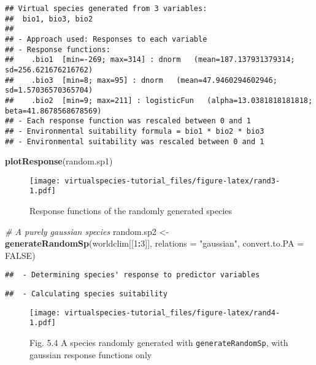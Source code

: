 \documentclass[]{article}
\newenvironment{Shaded}{\begin{snugshade}}{\end{snugshade}}
\newcommand{\KeywordTok}[1]{\textcolor[rgb]{0.13,0.29,0.53}{\textbf{#1}}}
\newcommand{\DataTypeTok}[1]{\textcolor[rgb]{0.13,0.29,0.53}{#1}}
\newcommand{\DecValTok}[1]{\textcolor[rgb]{0.00,0.00,0.81}{#1}}
\newcommand{\StringTok}[1]{\textcolor[rgb]{0.31,0.60,0.02}{#1}}
\newcommand{\CommentTok}[1]{\textcolor[rgb]{0.56,0.35,0.01}{\textit{#1}}}
\newcommand{\OtherTok}[1]{\textcolor[rgb]{0.56,0.35,0.01}{#1}}
\newcommand{\OperatorTok}[1]{\textcolor[rgb]{0.81,0.36,0.00}{\textbf{#1}}}
\newcommand{\NormalTok}[1]{#1}
\begin{document}
\begin{verbatim}
## Virtual species generated from 3 variables:
##  bio1, bio3, bio2
## 
## - Approach used: Responses to each variable
## - Response functions:
##    .bio1  [min=-269; max=314] : dnorm   (mean=187.137931379314; sd=256.621676216762)
##    .bio3  [min=8; max=95] : dnorm   (mean=47.9460294602946; sd=1.57036570365704)
##    .bio2  [min=9; max=211] : logisticFun   (alpha=13.0381818181818; beta=41.8678568678569)
## - Each response function was rescaled between 0 and 1
## - Environmental suitability formula = bio1 * bio2 * bio3
## - Environmental suitability was rescaled between 0 and 1
\end{verbatim}

\begin{Shaded}
\begin{Highlighting}[]
\KeywordTok{plotResponse}\NormalTok{(random.sp1)}
\end{Highlighting}
\end{Shaded}

\begin{figure}
\centering
\texttt{[image: virtualspecies-tutorial\_files/figure-latex/rand3-1.pdf]}
\caption{Response functions of the randomly generated species}
\end{figure}

\begin{Shaded}
\begin{Highlighting}[]
\CommentTok{# A purely gaussian species}
\NormalTok{random.sp2 <-}\StringTok{ }\KeywordTok{generateRandomSp}\NormalTok{(worldclim[[}\DecValTok{1}\OperatorTok{:}\DecValTok{3}\NormalTok{]], }
                              \DataTypeTok{relations =} \StringTok{"gaussian"}\NormalTok{,}
                              \DataTypeTok{convert.to.PA =} \OtherTok{FALSE}\NormalTok{)}
\end{Highlighting}
\end{Shaded}

\begin{verbatim}
##  - Determining species' response to predictor variables
\end{verbatim}

\begin{verbatim}
##  - Calculating species suitability
\end{verbatim}

\begin{figure}
\centering
\texttt{[image: virtualspecies-tutorial\_files/figure-latex/rand4-1.pdf]}
\caption{Fig. 5.4 A species randomly generated with
\texttt{generateRandomSp}, with gaussian response functions only}
\end{figure}
\end{document}
